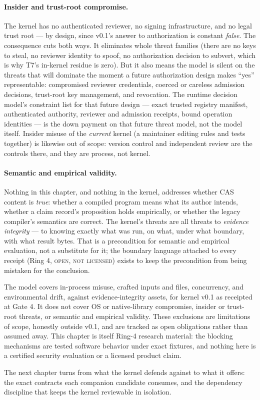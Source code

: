 \paragraph{Insider and trust-root compromise.} The kernel has no authenticated reviewer, no signing infrastructure, and no legal trust root --- by design, since v0.1's answer to authorization is constant \emph{false}. The consequence cuts both ways. It eliminates whole threat families (there are no keys to steal, no reviewer identity to spoof, no authorization decision to subvert, which is why T7's in-kernel residue is zero). But it also means the model is silent on the threats that will dominate the moment a future authorization design makes ``yes'' representable: compromised reviewer credentials, coerced or careless admission decisions, trust-root key management, and revocation. The runtime decision model's constraint list for that future design --- exact trusted registry manifest, authenticated authority, reviewer and admission receipts, bound operation identities --- is the down payment on that future threat model, not the model itself. Insider misuse of the \emph{current} kernel (a maintainer editing rules and tests together) is likewise out of scope: version control and independent review are the controls there, and they are process, not kernel.

\paragraph{Semantic and empirical validity.} Nothing in this chapter, and nothing in the kernel, addresses whether CAS content is \emph{true}: whether a compiled program means what its author intends, whether a claim record's proposition holds empirically, or whether the legacy compiler's semantics are correct. The kernel's threats are all threats to \emph{evidence integrity} --- to knowing exactly what was run, on what, under what boundary, with what result bytes. That is a precondition for semantic and empirical evaluation, not a substitute for it; the boundary language attached to every receipt (Ring 4, \textsc{open}, \textsc{not licensed}) exists to keep the precondition from being mistaken for the conclusion.

\begin{boundary}\label{threat:bd:scope}
The model covers in-process misuse, crafted inputs and files, concurrency, and environmental drift, against evidence-integrity assets, for kernel v0.1 as receipted at Gate 4. It does not cover OS or native-library compromise, insider or trust-root threats, or semantic and empirical validity. These exclusions are limitations of scope, honestly outside v0.1, and are tracked as open obligations rather than assumed away. This chapter is itself Ring-4 research material: the blocking mechanisms are tested software behavior under exact fixtures, and nothing here is a certified security evaluation or a licensed product claim.
\end{boundary}

The next chapter turns from what the kernel defends against to what it offers: the exact contracts each companion candidate consumes, and the dependency discipline that keeps the kernel reviewable in isolation.
